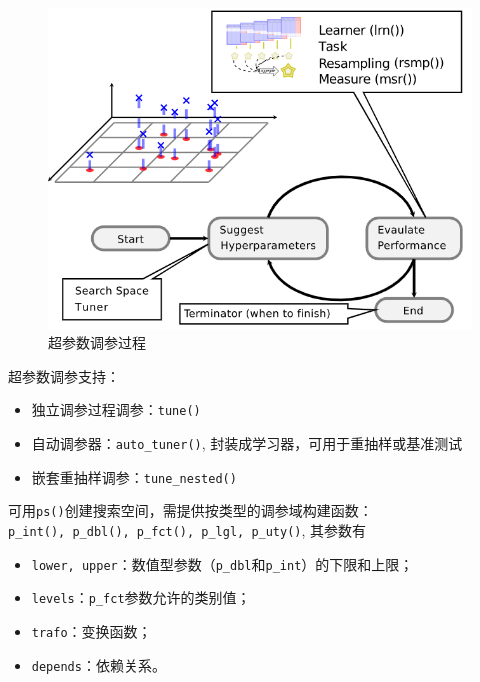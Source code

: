 \documentclass[
  11pt,
  ignorenonframetext,
  dvipsnames,UTF8]{beamer}
\providecommand{\tightlist}{%
  \setlength{\itemsep}{0pt}\setlength{\parskip}{0pt}}
\begin{document}
\begin{frame}{}
\protect\hypertarget{section-31}{}
\begin{figure}

{\centering \includegraphics[width=0.75\linewidth]{images/tuning_params} 

}

\caption{超参数调参过程}\label{fig:unnamed-chunk-40}
\end{figure}
\end{frame}

\begin{frame}[fragile]{}
\protect\hypertarget{section-32}{}
超参数调参支持：

\begin{itemize}
\tightlist
\item
  独立调参过程调参：\texttt{tune()}
\item
  自动调参器：\texttt{auto\_tuner()},
  封装成学习器，可用于重抽样或基准测试
\item
  嵌套重抽样调参：\texttt{tune\_nested()}
\end{itemize}

可用\texttt{ps()}创建搜索空间，需提供按类型的调参域构建函数：\texttt{p\_int(),\ p\_dbl(),\ p\_fct(),\ p\_lgl,\ p\_uty()},
其参数有

\begin{itemize}
\tightlist
\item
  \texttt{lower,\ upper}：数值型参数（\texttt{p\_dbl}和\texttt{p\_int}）的下限和上限；
\item
  \texttt{levels}：\texttt{p\_fct}参数允许的类别值；
\item
  \texttt{trafo}：变换函数；
\item
  \texttt{depends}：依赖关系。
\end{itemize}
\end{frame}
\end{document}
